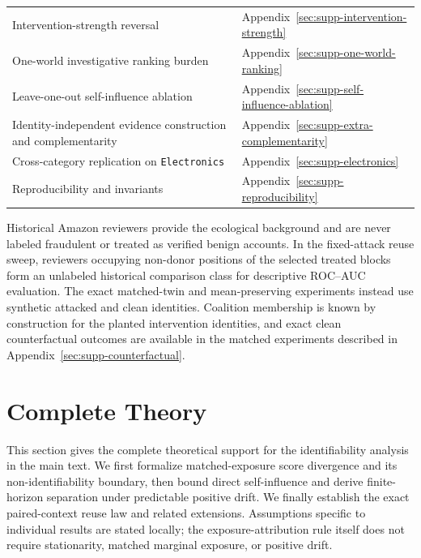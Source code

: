 \begin{table}[t]
\begin{tabularx}{\columnwidth}{@{}
  >{\raggedright\arraybackslash}X
  >{\raggedright\arraybackslash}X@{}}
Intervention-strength reversal
&
Appendix~\ref{sec:supp-intervention-strength}
\\

One-world investigative ranking burden
&
Appendix~\ref{sec:supp-one-world-ranking}

\\

Leave-one-out self-influence ablation
&
Appendix~\ref{sec:supp-self-influence-ablation}

\\
Identity-independent evidence construction and complementarity
&
Appendix~\ref{sec:supp-extra-complementarity}
\\

Cross-category replication on \texttt{Electronics}
&
Appendix~\ref{sec:supp-electronics}
\\

Reproducibility and invariants
&
Appendix~\ref{sec:supp-reproducibility}
\\

\bottomrule
\end{tabularx}
\end{table}


Historical Amazon reviewers provide the ecological background and are never
labeled fraudulent or treated as verified benign accounts. In the
fixed-attack reuse sweep, reviewers occupying non-donor positions of the
selected treated blocks form an unlabeled historical comparison class for
descriptive ROC--AUC evaluation. The exact matched-twin and mean-preserving
experiments instead use synthetic attacked and clean identities. Coalition
membership is known by construction for the planted intervention identities,
and exact clean counterfactual outcomes are available in the matched
experiments described in Appendix~\ref{sec:supp-counterfactual}.




\section{Complete Theory}
\label{sec:supp-theory}

This section gives the complete theoretical support for the identifiability
analysis in the main text. We first formalize matched-exposure score
divergence and its non-identifiability boundary, then bound direct
self-influence and derive finite-horizon separation under predictable positive
drift. We finally establish the exact paired-context reuse law and related
extensions. Assumptions specific to individual results are stated locally;
the exposure-attribution rule itself does not require stationarity, matched
marginal exposure, or positive drift.

